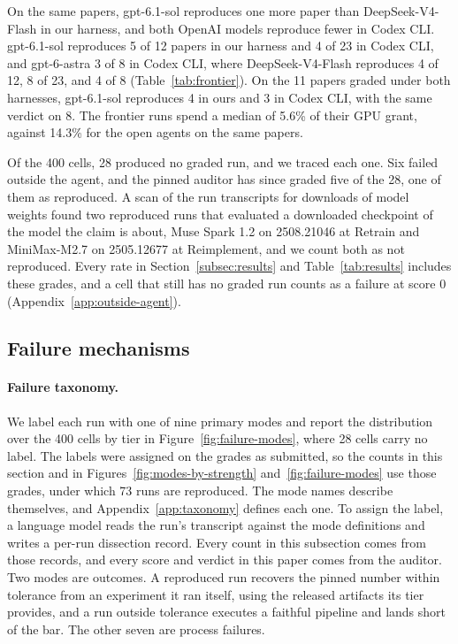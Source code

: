 \documentclass{article} %
\newcommand{\todo}[1]{#1}%
\begin{document}
On the same papers, gpt-6.1-sol reproduces \todo{one more paper than}
DeepSeek-V4-Flash in our harness, and both OpenAI models reproduce fewer in
Codex CLI. gpt-6.1-sol reproduces \todo{5 of 12} papers in our harness and
\todo{4 of 23} in Codex CLI, and gpt-6-astra \todo{3 of 8} in Codex CLI, where
DeepSeek-V4-Flash reproduces \todo{4 of 12}, \todo{8 of 23}, and \todo{4 of 8}
(Table~\ref{tab:frontier}). On the \todo{11} papers graded under both harnesses,
gpt-6.1-sol reproduces \todo{4} in ours and \todo{3} in Codex CLI, with the
same verdict on \todo{8}. The frontier runs spend a median of \todo{5.6}\% of
their GPU grant, against \todo{14.3}\% for the open agents on the same papers.

Of the 400 cells, 28 produced no graded run, and we traced each one. Six
failed outside the agent, and the pinned auditor has since graded five of the
28, one of them as reproduced. A scan of the run transcripts for downloads of
model weights found two reproduced runs that evaluated a downloaded checkpoint
of the model the claim is about, Muse Spark 1.2 on 2508.21046 at Retrain and
MiniMax-M2.7 on 2505.12677 at Reimplement, and we count both as not
reproduced. Every rate in Section~\ref{subsec:results} and Table~\ref{tab:results} includes these grades, and a cell that
still has no graded run counts as a failure at score 0
(Appendix~\ref{app:outside-agent}).

\subsection{Failure mechanisms}
\label{subsec:mechanisms}

\paragraph{Failure taxonomy.}
We label each run with one of nine primary modes and report the
distribution over the 400 cells by tier in Figure~\ref{fig:failure-modes}, where
28 cells carry no label. The labels were assigned on the grades as submitted, so the counts in this section and in Figures~\ref{fig:modes-by-strength} and~\ref{fig:failure-modes} use those grades, under which 73 runs are reproduced. The mode names describe
themselves, and Appendix~\ref{app:taxonomy} defines each one. To assign the label, a language model reads the run's
transcript against the mode definitions and writes a per-run dissection
record. Every count in this subsection comes from those records, and every
score and verdict in this paper comes from the auditor. Two modes are outcomes. A
reproduced run recovers the pinned number within tolerance from an experiment
it ran itself, using the released artifacts its tier provides, and a run outside tolerance executes a faithful pipeline
and lands short of the bar. The other seven are process failures.
\end{document}
